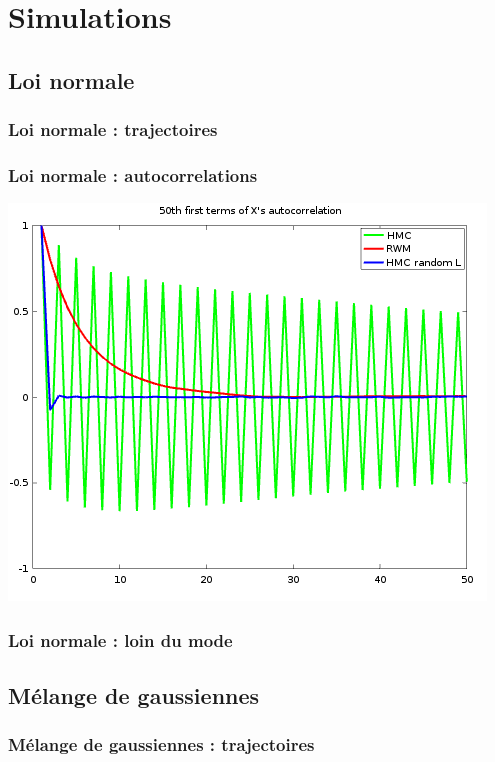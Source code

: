 \documentclass[10pt]{beamer}
\begin{document}
\section{Simulations}
\subsection{Loi normale}
\begin{frame}
  \frametitle{Loi normale : trajectoires}
\begin{center}
  \end{center}  
\end{frame}

\begin{frame}
  \frametitle{Loi normale : autocorrelations}
\begin{center}
      \includegraphics[width=.8\textwidth]{figs/normal_autocor.png}
  \end{center}  
\end{frame}

\begin{frame}
  \frametitle{Loi normale : loin du mode}
\begin{center}
  \end{center}  
\end{frame}
\subsection{Mélange de gaussiennes}
\begin{frame}
  \frametitle{Mélange de gaussiennes : trajectoires}
\begin{center}
  \end{center}  
\end{frame}
\end{document}
